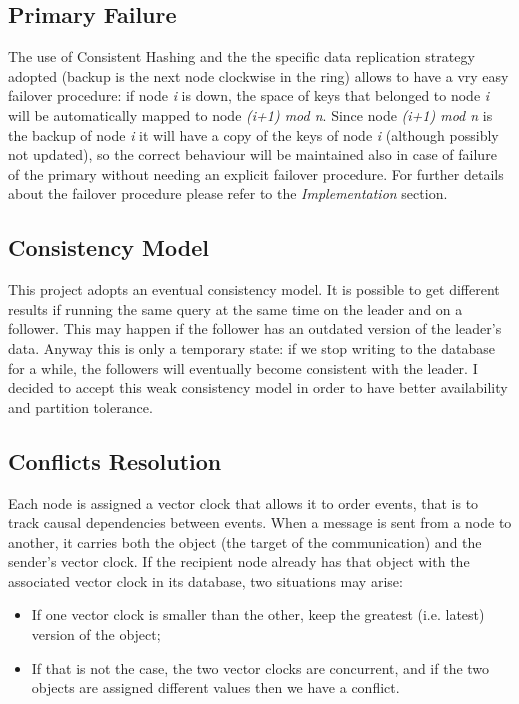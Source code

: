 \documentclass{article}
\begin{document}
\subsection{Primary Failure}
The use of Consistent Hashing and the the specific data replication strategy adopted (backup is the next node clockwise in the ring) allows to have a vry easy failover procedure: if node \textit{i} is down, the space of keys that belonged to node \textit{i} will be automatically mapped to node \textit{(i+1) mod n}. Since node \textit{(i+1) mod n} is the backup of node \textit{i} it will have a copy of the keys of node \textit{i} (although possibly not updated), so the correct behaviour will be maintained also in case of failure of the primary without needing an explicit failover procedure. For further details about the failover procedure please refer to the  \textit{Implementation} section.    


\subsection{Consistency Model}
This project adopts an eventual consistency model. It is possible to get different results if running the same query at the same time on the leader and on a follower. This may happen if the follower has an outdated version of the leader's data. Anyway this is only a temporary state: if we stop writing to the database for a while, the followers will eventually become consistent with the leader. I decided to accept this weak consistency model in order to have better availability and partition tolerance. 

\subsection{Conflicts Resolution}
Each node is assigned a vector clock that allows it to order events, that is to track causal dependencies between events. When a message is sent from a node to another, it carries both the object (the target of the communication) and the sender's vector clock. If the recipient node already has that object with the associated vector clock in its database, two situations may arise:
\begin{itemize}
\item  If one vector clock is smaller than the other, keep the greatest (i.e. latest) version of the object;
\item  {}If that is not the case, the two vector clocks are concurrent, and if the two objects are assigned different values then we have a conflict.
\end{itemize}
\end{document}
